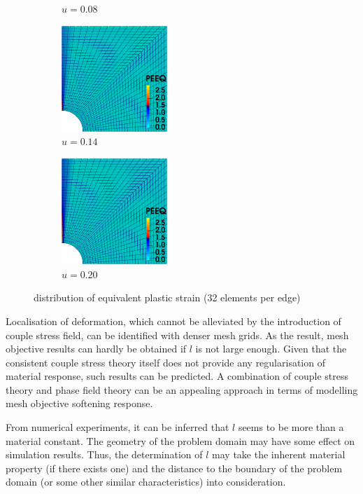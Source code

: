 \documentclass[3p,sort&compress,11pt,fleqn,review]{elsarticle}
\begin{document}
\begin{figure}[ht]
\begin{subfigure}[b]{.33\textwidth}
\caption{$u=\num{0.08}$}
\end{subfigure}\hfill
\begin{subfigure}[b]{.33\textwidth}\centering
\includegraphics[width=4cm]{PIC/P3270}
\caption{$u=\num{0.14}$}
\end{subfigure}\hfill
\begin{subfigure}[b]{.33\textwidth}\centering
\includegraphics[width=4cm]{PIC/P32100}
\caption{$u=\num{0.20}$}
\end{subfigure}
\caption{distribution of equivalent plastic strain (32 elements per edge)}\label{fig:peeq32}
\end{figure}
Localisation of deformation, which cannot be alleviated by the introduction of couple stress field, can be identified with denser mesh grids. As the result, mesh objective results can hardly be obtained if $l$ is not large enough. Given that the consistent couple stress theory itself does not provide any regularisation of material response, such results can be predicted. A combination of couple stress theory and phase field theory \citep{Bourdin2008} can be an appealing approach in terms of modelling mesh objective softening response.

From numerical experiments, it can be inferred that $l$ seems to be more than a material constant. The geometry of the problem domain may have some effect on simulation results. Thus, the determination of $l$ may take the inherent material property (if there exists one) and the distance to the boundary of the problem domain (or some other similar characteristics) into consideration.
\end{document}
